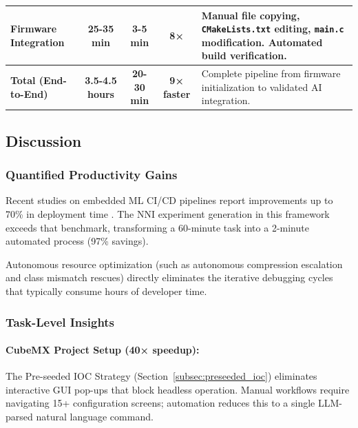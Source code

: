 \begin{table}[htbp]
\begin{tabular}{|l|c|c|c|p{4cm}|}
        \hline
        \textbf{Firmware Integration} & 25-35 min              & 3-5 min            & 8×                 & Manual file copying, \texttt{CMakeLists.txt} editing, \texttt{main.c} modification. Automated build verification.                                                                  \\
        \hline
        \hline
        \textbf{Total (End-to-End)}   & \textbf{3.5-4.5 hours} & \textbf{20-30 min} & \textbf{9× faster} & Complete pipeline from firmware initialization to validated AI integration.                                                                                                        \\
        \hline
    \end{tabular}
\end{table}

\subsection{Discussion}

\subsubsection{Quantified Productivity Gains}

Recent studies on embedded ML CI/CD pipelines report improvements up to 70\% in deployment time \cite{embedded_ml_cicd_2025}. The NNI experiment generation in this framework exceeds that benchmark, transforming a 60-minute task into a 2-minute automated process (97\% savings).

Autonomous resource optimization (such as autonomous compression escalation and class mismatch rescues) directly eliminates the iterative debugging cycles that typically consume hours of developer time.

\subsubsection{Task-Level Insights}

\paragraph{CubeMX Project Setup (40× speedup):} The Pre-seeded IOC Strategy (Section~\ref{subsec:preseeded_ioc}) eliminates interactive GUI pop-ups that block headless operation. Manual workflows require navigating 15+ configuration screens; automation reduces this to a single LLM-parsed natural language command.

